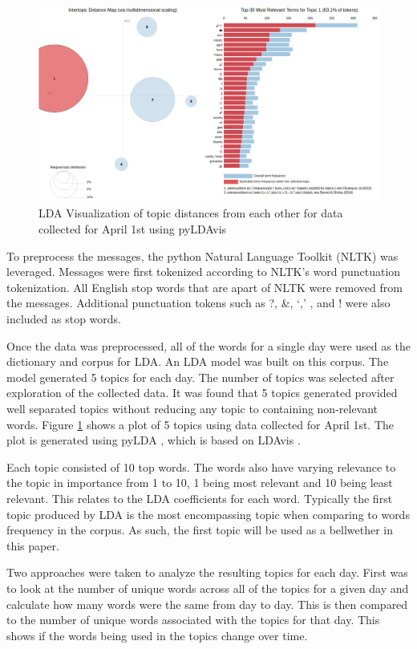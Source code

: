 \documentclass[conference]{IEEEtran}
\begin{document}
\begin{figure}[!t]
  \centering
  \includegraphics[width=\linewidth]{ldaVisTopics}
  \caption{LDA Visualization of topic distances from each other for data collected for April 1st using pyLDAvis}
  \label{fig:LDA-Distance}
\end{figure}

To preprocess the messages, the python Natural Language Toolkit (NLTK) \cite{NLTK} was leveraged. Messages were first tokenized according to NLTK's word punctuation tokenization. All English stop words that are apart of NLTK were removed from the messages. Additional punctuation tokens such as ?, \&, `,' , and ! were also included as stop words. 

Once the data was preprocessed, all of the words for a single day were used as the dictionary and corpus for LDA. An LDA model was built on this corpus. The model generated 5 topics for each day. The number of topics was selected after exploration of the collected data. It was found that 5 topics generated provided well separated topics without reducing any topic to containing non-relevant words. Figure \ref{fig:LDA-Distance} shows a plot of 5 topics using data collected for April 1st. The plot is generated using pyLDA \cite{pyLDA}, which is based on LDAvis \cite{LDAvis}.

Each topic consisted of 10 top words. The words also have varying relevance to the topic in importance from 1 to 10, 1 being most relevant and 10 being least relevant. This relates to the LDA coefficients for each word. Typically the first topic produced by LDA is the most encompassing topic when comparing to words frequency in the corpus. As such, the first topic will be used as a bellwether in this paper. 

Two approaches were taken to analyze the resulting topics for each day. First was to look at the number of unique words across all of the topics for a given day and calculate how many words were the same from day to day. This is then compared to the number of unique words associated with the topics for that day. This shows if the words being used in the topics change over time. 
\end{document}
